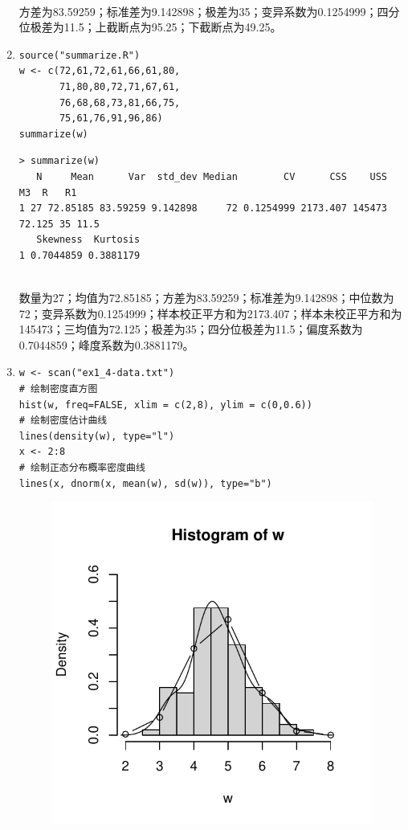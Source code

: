 \begin{enumerate}
        \summary\\
        方差为83.59259；标准差为9.142898；极差为35；变异系数为0.1254999；四分位极差为11.5；上截断点为95.25；下截断点为49.25。
        \item
        \code
\begin{lstlisting}
source("summarize.R")
w <- c(72,61,72,61,66,61,80,
       71,80,80,72,71,67,61,
       76,68,68,73,81,66,75,
       75,61,76,91,96,86)
summarize(w)
\end{lstlisting}
        \out
\begin{lstlisting}
> summarize(w)
   N     Mean      Var  std_dev Median        CV      CSS    USS     M3  R   R1
1 27 72.85185 83.59259 9.142898     72 0.1254999 2173.407 145473 72.125 35 11.5
   Skewness  Kurtosis
1 0.7044859 0.3881179
\end{lstlisting}
        \summary\\
        数量为27；均值为72.85185；方差为83.59259；标准差为9.142898；中位数为72；变异系数为0.1254999；样本校正平方和为2173.407；样本未校正平方和为145473；三均值为72.125；极差为35；四分位极差为11.5；偏度系数为0.7044859；峰度系数为0.3881179。
        \item
        \code
\begin{lstlisting}
w <- scan("ex1_4-data.txt")
# 绘制密度直方图
hist(w, freq=FALSE, xlim = c(2,8), ylim = c(0,0.6))
# 绘制密度估计曲线
lines(density(w), type="l")
x <- 2:8
# 绘制正态分布概率密度曲线
lines(x, dnorm(x, mean(w), sd(w)), type="b")
\end{lstlisting}
        \out
        \begin{figure}[H]
            \centering
            \includegraphics[scale=0.7]{1-4.pdf}

\end{figure}
\end{enumerate}
